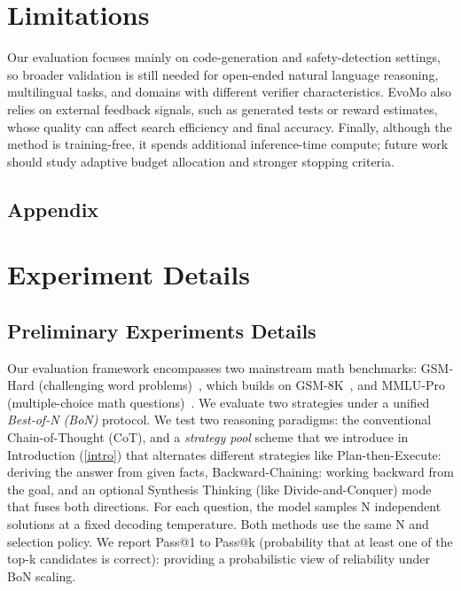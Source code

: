 \documentclass[11pt]{article}
\theoremstyle{definition}
\theoremstyle{remark}
\begin{document}
\section{Limitations}
Our evaluation focuses mainly on code-generation and safety-detection settings, so broader validation is still needed for open-ended natural language reasoning, multilingual tasks, and domains with different verifier characteristics. EvoMo also relies on external feedback signals, such as generated tests or reward estimates, whose quality can affect search efficiency and final accuracy. Finally, although the method is training-free, it spends additional inference-time compute; future work should study adaptive budget allocation and stronger stopping criteria.




\clearpage

\appendix

\begin{center}
\section*{Appendix}
\end{center}



\section{Experiment Details}
\label{experiment111}
\subsection{Preliminary Experiments Details}
Our evaluation framework encompasses two mainstream math benchmarks: GSM-Hard (challenging word problems)~\citep{gao2023pal}, which builds on GSM-8K~\citep{cobbe2021training}, and MMLU-Pro (multiple-choice math questions)~\citep{wang2024mmlu}. We evaluate two strategies under a unified \textit{Best-of-N (BoN)} protocol. We test two reasoning paradigms: the conventional Chain-of-Thought (CoT), and a \textit{strategy pool} scheme that we introduce in 
Introduction (\autoref{intro}) that alternates different strategies like Plan-then-Execute: deriving the answer from given facts, Backward-Chaining: working backward from the goal, and an optional Synthesis Thinking (like Divide-and-Conquer) mode that fuses both directions. For each question, the model samples N independent solutions at a fixed decoding temperature. Both methods use the same N and selection policy. We report Pass@1 to Pass@k (probability that at least one of the top-k candidates is correct): providing a probabilistic view of reliability under BoN scaling.
\end{document}

